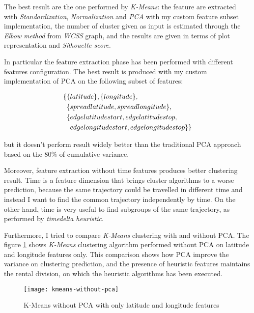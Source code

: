 The best result are the one performed by \textit{K-Means}: the feature are extracted with \textit{Standardization}, \textit{Normalization} and \textit{PCA} with my custom feature subset implementation, the number of cluster given as input is estimated through the \textit{Elbow method} from \textit{WCSS} graph, and the results are given in terms of plot representation and \textit{Silhouette score}. 

In particular the feature extraction phase has been performed with different features configuration. The best result is produced with my custom implementation of PCA on the following subset of features: 

\begin{align}
\{ &\{ latitude\} , \{longitude\}, \notag\\
 &\{spread\-latitude, spread\-longitude\}, \notag\\
 &\{edge\-latitude\-start, edge\-latitude\-stop, \notag\\ 
 &\phantom{\{}edge\-longitude\-start, edge\-longitude\-stop\} \}\notag
\end{align} 

but it doesn't perform result widely better than the traditional PCA approach based on the $80\%$ of cumulative variance. 

Moreover, feature extraction without time features produces better clustering result. Time is a feature dimension that brings cluster algorithms to a worse prediction, because the same trajectory could be travelled in different time and instead I want to find the common trajectory independently by time. On the other hand, time is very useful to find subgroups of the same trajectory, as performed by \textit{timedelta heuristic}.

Furthermore, I tried to compare \textit{K-Means} clustering with and without PCA. The figure \ref{fig:kmeans-without-pca} shows \textit{K-Means} clustering algorithm performed without PCA on latitude and longitude features only. This comparison shows how PCA improve the variance on clustering prediction, and the presence of heuristic features maintains the rental division, on which the heuristic algorithms has been executed.  

\begin{figure}[bt]
	\centering
	\texttt{[image: kmeans-without-pca]}
	\caption{K-Means without PCA with only latitude and longitude features}
	\label{fig:kmeans-without-pca}
\end{figure}

